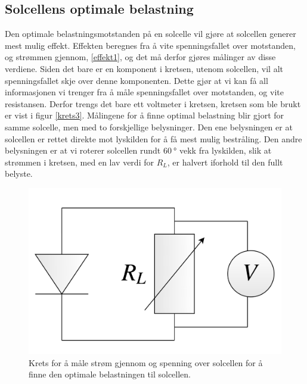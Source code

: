 \documentclass[%
 reprint,
 amsmath,amssymb,
 aps,
 norsk,
 booktabs
]{revtex4-1}
\begin{document}
\subsection{Solcellens optimale belastning}
Den optimale belastningsmotstanden på en solcelle vil gjøre at solcellen generer mest mulig effekt. Effekten beregnes fra å vite spenningsfallet over motstanden, og strømmen gjennom, \eqref{effekt1}, og det må derfor gjøres målinger av disse verdiene. Siden det bare er en komponent i kretsen, utenom solcellen, vil alt spenningsfallet skje over denne komponenten. Dette gjør at vi kan få all informasjonen vi trenger fra å måle spenningsfallet over motstanden, og vite resistansen. Derfor trengs det bare ett voltmeter i kretsen, kretsen som ble brukt er vist i figur \vref{krets3}. Målingene for å finne optimal belastning blir gjort for samme solcelle, men med to forskjellige belysninger. Den ene belysningen er at solcellen er rettet direkte mot lyskilden for å få mest mulig bestråling. Den andre belysningen er at vi roterer solcellen rundt $\SI{60}{\degree}$ vekk fra lyskilden, slik at strømmen i kretsen, med en lav verdi for $R_L$, er halvert iforhold til den fullt belyste.
\begin{figure}[h!]
  \centering
  \includegraphics[scale=0.11]{krets3.png}
  \caption{Krets for å måle strøm gjennom og spenning over solcellen for å finne den optimale belastningen til solcellen.}
  \label{krets3}
\end{figure}
\end{document}
